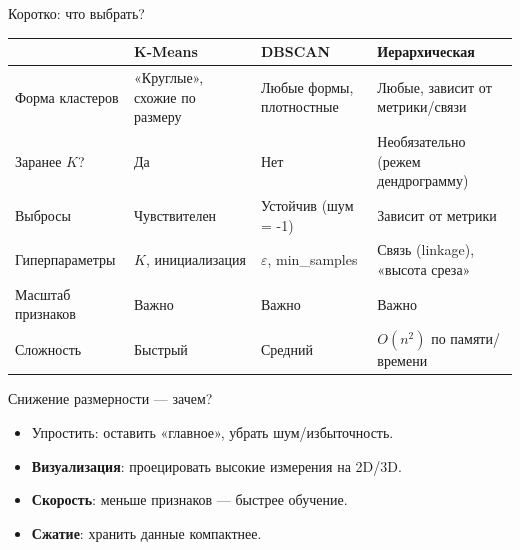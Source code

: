 \documentclass[aspectratio=169]{beamer}
\newcommand{\term}[1]{\textbf{#1}}
\begin{document}
\begin{frame}{Коротко: что выбрать?}
	\small
	\begin{tabular}{@{}p{3.1cm} p{3.3cm} p{3.3cm} p{3.3cm}@{}}
		\toprule
		                  & \textbf{K-Means}             & \textbf{DBSCAN}               & \textbf{Иерархическая}             \\
		\midrule
		Форма кластеров   & «Круглые», схожие по размеру & Любые формы, плотностные      & Любые, зависит от метрики/связи    \\
		Заранее \(K\)?    & Да                           & Нет                           & Необязательно (режем дендрограмму) \\
		Выбросы           & Чувствителен                 & Устойчив (шум = -1)           & Зависит от метрики                 \\
		Гиперпараметры    & \(K\), инициализация         & \(\varepsilon\), min\_samples & Связь (linkage), «высота среза»    \\
		Масштаб признаков & Важно                        & Важно                         & Важно                              \\
		Сложность         & Быстрый                      & Средний                       & \(O(n^2)\) по памяти/времени       \\
		\bottomrule
	\end{tabular}
\end{frame}

\begin{frame}{Снижение размерности — зачем?}
	\begin{itemize}
		\item Упростить: оставить «главное», убрать шум/избыточность.
		\item \term{Визуализация}: проецировать высокие измерения на 2D/3D.
		\item \term{Скорость}: меньше признаков — быстрее обучение.
		\item \term{Сжатие}: хранить данные компактнее.
	\end{itemize}
\end{frame}
\end{document}
